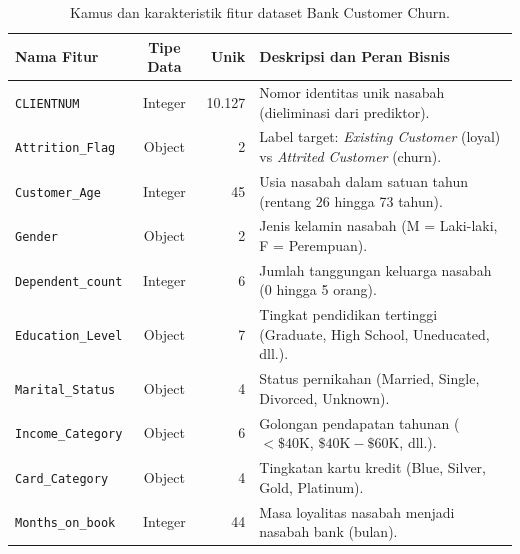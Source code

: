 \documentclass[a4paper,oneside,12pt]{report}
\begin{document}
\begin{table}[H]
	\centering
	\caption{Kamus dan karakteristik fitur dataset Bank Customer Churn.}
	\label{tab:fitur-churn}
	\scriptsize
	\begin{tabularx}{\linewidth}{|l|c|r|>{\raggedright\arraybackslash}X|}
		\hline
		\textbf{Nama Fitur}                 & \textbf{Tipe Data} & \textbf{Unik} & \textbf{Deskripsi dan Peran Bisnis}                                                     \\
		\hline
		\texttt{CLIENTNUM}                  & Integer            & 10.127        & Nomor identitas unik nasabah (dieliminasi dari prediktor).                              \\
		\hline
		\texttt{Attrition\_Flag}            & Object             & 2             & Label target: \textit{Existing Customer} (loyal) vs \textit{Attrited Customer} (churn). \\
		\hline
		\texttt{Customer\_Age}              & Integer            & 45            & Usia nasabah dalam satuan tahun (rentang 26 hingga 73 tahun).                           \\
		\hline
		\texttt{Gender}                     & Object             & 2             & Jenis kelamin nasabah (M = Laki-laki, F = Perempuan).                                   \\
		\hline
		\texttt{Dependent\_count}           & Integer            & 6             & Jumlah tanggungan keluarga nasabah (0 hingga 5 orang).                                  \\
		\hline
		\texttt{Education\_Level}           & Object             & 7             & Tingkat pendidikan tertinggi (Graduate, High School, Uneducated, dll.).                 \\
		\hline
		\texttt{Marital\_Status}            & Object             & 4             & Status pernikahan (Married, Single, Divorced, Unknown).                                 \\
		\hline
		\texttt{Income\_Category}           & Object             & 6             & Golongan pendapatan tahunan ($<\$40\text{K}$, $\$40\text{K}-\$60\text{K}$, dll.).       \\
			\hline
		\texttt{Card\_Category}             & Object             & 4             & Tingkatan kartu kredit (Blue, Silver, Gold, Platinum).                                  \\
			\hline
		\texttt{Months\_on\_book}           & Integer            & 44            & Masa loyalitas nasabah menjadi nasabah bank (bulan).                                    \\

\end{tabularx}
\end{table}
\end{document}
